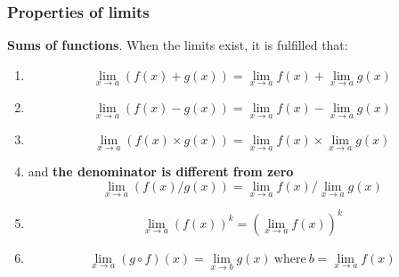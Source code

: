 \documentclass[a4paper,11pt]{article}
\theoremstyle{definition}
\theoremstyle{plain}
\begin{document}
\subsubsection{Properties of limits}\label{properties-of-limits}

\textbf{Sums of functions}. When the limits exist, it is fulfilled that:

\begin{enumerate}
	\item \[\lim_{x\rightarrow a}\left(f(x) + g(x)\right) = \lim_{x\rightarrow a} f(x) + \lim_{x\rightarrow a} g(x)\]
	\item \[\lim_{x\rightarrow a}\left(f(x) - g(x)\right) = \lim_{x\rightarrow a} f(x) - \lim_{x\rightarrow a} g(x)\]
	\item \[\lim_{x\rightarrow a}\left(f(x) \times g(x)\right) = \lim_{x\rightarrow a} f(x) \times \lim_{x\rightarrow a} g(x)\]
	\item  and \textbf{the denominator is different from zero}
	\[\lim_{x\rightarrow a}\left(f(x) / g(x)\right) = \lim_{x\rightarrow a} f(x) / \lim_{x\rightarrow a} g(x)\]
	\item \[\lim_{x\rightarrow a}\left(f(x)\right)^k = \left(\lim_{x\rightarrow a} f(x)\right)^k\]
	\item \[\lim_{x\rightarrow a}\left(g\circ f\right)(x) = \lim_{x\rightarrow b} g(x) \ \text{where} \ b = \lim_{x\rightarrow a}f(x)\]
\end{enumerate}
\end{document}
